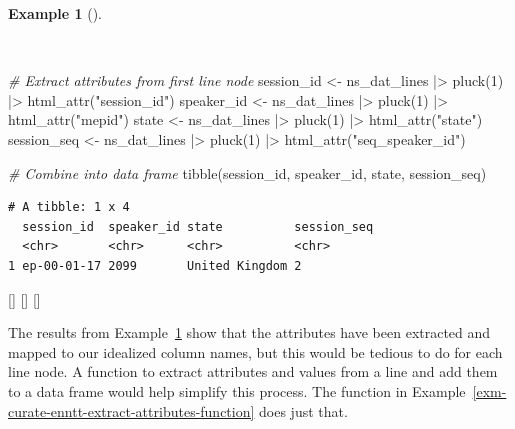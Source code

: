 \documentclass[
  letterpaper,
  krantz1]{latex/krantz-mod}
\newenvironment{Shaded}{\begin{snugshade}}{\end{snugshade}}
\newcommand{\CommentTok}[1]{\textcolor[rgb]{0.00,0.00,0.00}{\textit{#1}}}
\newcommand{\DecValTok}[1]{\textcolor[rgb]{0.00,0.00,0.00}{#1}}
\newcommand{\FunctionTok}[1]{\textcolor[rgb]{0.00,0.00,0.00}{#1}}
\newcommand{\NormalTok}[1]{\textcolor[rgb]{0.00,0.00,0.00}{#1}}
\newcommand{\OtherTok}[1]{\textcolor[rgb]{0.00,0.00,0.00}{#1}}
\newcommand{\SpecialCharTok}[1]{\textcolor[rgb]{0.00,0.00,0.00}{#1}}
\newcommand{\StringTok}[1]{\textcolor[rgb]{0.00,0.00,0.00}{#1}}
\newcommand{\cindex}[1]{%
  \StrSubstitute{#1}{_}{\_}[\temp]%
  \index{\temp}%
}
\theoremstyle{definition}
\theoremstyle{definition}
\newtheorem{example}{Example}[chapter]
\theoremstyle{remark}
\begin{document}
\begin{example}[]\protect\hypertarget{exm-curate-enntt-extract-attributes}{}\label{exm-curate-enntt-extract-attributes}

~

\begin{Shaded}
\begin{Highlighting}[numbers=left,,]
\CommentTok{\# Extract attributes from first line node}
\NormalTok{session\_id }\OtherTok{\textless{}{-}}\NormalTok{ ns\_dat\_lines }\SpecialCharTok{|\textgreater{}} \FunctionTok{pluck}\NormalTok{(}\DecValTok{1}\NormalTok{) }\SpecialCharTok{|\textgreater{}} \FunctionTok{html\_attr}\NormalTok{(}\StringTok{"session\_id"}\NormalTok{)}
\NormalTok{speaker\_id }\OtherTok{\textless{}{-}}\NormalTok{ ns\_dat\_lines }\SpecialCharTok{|\textgreater{}} \FunctionTok{pluck}\NormalTok{(}\DecValTok{1}\NormalTok{) }\SpecialCharTok{|\textgreater{}} \FunctionTok{html\_attr}\NormalTok{(}\StringTok{"mepid"}\NormalTok{)}
\NormalTok{state }\OtherTok{\textless{}{-}}\NormalTok{ ns\_dat\_lines }\SpecialCharTok{|\textgreater{}} \FunctionTok{pluck}\NormalTok{(}\DecValTok{1}\NormalTok{) }\SpecialCharTok{|\textgreater{}} \FunctionTok{html\_attr}\NormalTok{(}\StringTok{"state"}\NormalTok{)}
\NormalTok{session\_seq }\OtherTok{\textless{}{-}}\NormalTok{ ns\_dat\_lines }\SpecialCharTok{|\textgreater{}} \FunctionTok{pluck}\NormalTok{(}\DecValTok{1}\NormalTok{) }\SpecialCharTok{|\textgreater{}} \FunctionTok{html\_attr}\NormalTok{(}\StringTok{"seq\_speaker\_id"}\NormalTok{)}

\CommentTok{\# Combine into data frame}
\FunctionTok{tibble}\NormalTok{(session\_id, speaker\_id, state, session\_seq)}
\end{Highlighting}
\end{Shaded}

\begin{verbatim}
# A tibble: 1 x 4
  session_id  speaker_id state          session_seq
  <chr>       <chr>      <chr>          <chr>      
1 ep-00-01-17 2099       United Kingdom 2          
\end{verbatim}

\cindex{pluck()}\cindex{html_attr()}\cindex{tibble()}

\end{example}

The results from Example~\ref{exm-curate-enntt-extract-attributes} show
that the attributes have been extracted and mapped to our idealized
column names, but this would be tedious to do for each line node. A
function to extract attributes and values from a line and add them to a
data frame would help simplify this process. The
function in Example~\ref{exm-curate-enntt-extract-attributes-function}
does just that.
\end{document}

